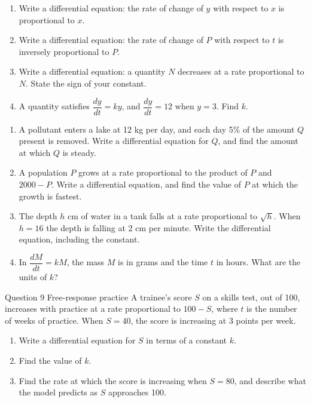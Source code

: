 \documentclass[11pt]{article}
\begin{document}
\begin{enumerate}[leftmargin=*,itemsep=2pt]
  \item Write a differential equation: the rate of change of $y$ with respect to $x$ is proportional to $x$.\work{2.3cm}
  \item Write a differential equation: the rate of change of $P$ with respect to $t$ is inversely proportional to $P$.\work{2.3cm}
  \item Write a differential equation: a quantity $N$ decreases at a rate proportional to $N$. State the sign of your constant.\work{2.3cm}
  \item A quantity satisfies $\dfrac{dy}{dt}=ky$, and $\dfrac{dy}{dt}=12$ when $y=3$. Find $k$.\work{2.3cm}
\end{enumerate}

\begin{enumerate}[leftmargin=*,itemsep=2pt,start=5]
  \item A pollutant enters a lake at 12 kg per day, and each day 5\% of the amount $Q$ present is removed. Write a differential equation for $Q$, and find the amount at which $Q$ is steady.\work{2.8cm}
  \item A population $P$ grows at a rate proportional to the product of $P$ and $2000-P$. Write a differential equation, and find the value of $P$ at which the growth is fastest.\work{2.8cm}
  \item The depth $h$ cm of water in a tank falls at a rate proportional to $\sqrt{h}$. When $h=16$ the depth is falling at 2 cm per minute. Write the differential equation, including the constant.\work{2.8cm}
  \item In $\dfrac{dM}{dt}=kM$, the mass $M$ is in grams and the time $t$ in hours. What are the units of $k$?\work{2.8cm}
\end{enumerate}

\begin{frbox}{Question 9 \textperiodcentered{} Free-response practice}
A trainee's score $S$ on a skills test, out of 100, increases with practice at a rate proportional to $100-S$, where $t$ is the number of weeks of practice. When $S=40$, the score is increasing at 3 points per week.
\begin{enumerate}[label=(\alph*),leftmargin=*,itemsep=2pt]
  \item Write a differential equation for $S$ in terms of a constant $k$.\work{2.6cm}
  \item Find the value of $k$.\work{2.6cm}
  \item Find the rate at which the score is increasing when $S=80$, and describe what the model predicts as $S$ approaches 100.\work{2.6cm}
\end{enumerate}
\end{frbox}
\end{document}
